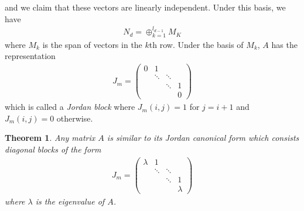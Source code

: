 \documentclass[11pt]{book}
\newtheorem{theorem}{Theorem}[section]
\theoremstyle{definition}
\numberwithin{equation}{chapter}
\begin{document}
and we claim that these vectors are linearly independent. Under this basis, we have 
\begin{align*}
    N_d = \oplus^{l_{d-1}}_{k=1} M_K
\end{align*}
where $M_k$ is the span of vectors in the $k$th row. Under the basis of $M_k$, $A$ has the representation
\begin{align*}
    J_m = \begin{pmatrix}
    0 & 1 &  &  \\
     &\ddots & \ddots & \\
     &   & \ddots & 1 \\
     &  &  & 0
    \end{pmatrix}
\end{align*}
which is called a \emph{Jordan block} where $J_m(i,j) = 1$ for $j = i+1$ and $J_m(i,j) = 0$ otherwise.

\medskip

\begin{theorem}
Any matrix $A$ is similar to its Jordan canonical form which consists diagonal blocks of the form 
\begin{align*}
    J_m = \begin{pmatrix}
    \lambda & 1 &  &  \\
     &\ddots & \ddots & \\
     &   & \ddots & 1 \\
     &  &  & \lambda
    \end{pmatrix}
\end{align*}
where $\lambda$ is the eigenvalue of $A$.
\end{theorem}

\medskip
\end{document}
